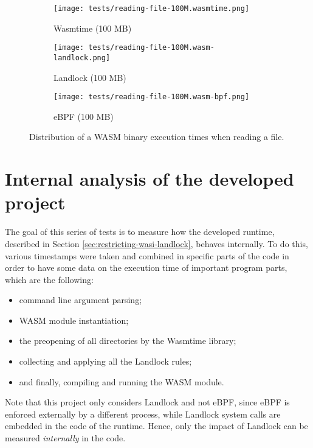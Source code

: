 \begin{figure}[ht!]
  \begin{subfigure}[b]{0.32\textwidth}
    \centering
    \texttt{[image: tests/reading-file-100M.wasmtime.png]}
    \caption{Wasmtime (100 MB)}
  \end{subfigure}
  \begin{subfigure}[b]{0.32\textwidth}
    \centering
    \texttt{[image: tests/reading-file-100M.wasm-landlock.png]}
    \caption{Landlock (100 MB)}
  \end{subfigure}
  \begin{subfigure}[b]{0.32\textwidth}
    \centering
    \texttt{[image: tests/reading-file-100M.wasm-bpf.png]}
    \caption{eBPF (100 MB)}
  \end{subfigure}

  \caption{Distribution of a WASM binary execution times when reading a file.}
  \label{fig:distribution-reading-wasm}
\end{figure}

\clearpage

\section{Internal analysis of the developed project}
\label{sec:performance-internal-analysis}

The goal of this series of tests is to measure how the developed runtime,
described in Section \ref{sec:restricting-wasi-landlock}, behaves internally.
To do this, various timestamps were taken and combined in specific parts of the
code in order to have some data on the execution time of important program parts,
which are the following:
\begin{itemize}
  \item command line argument parsing;
  \item WASM module instantiation;
  \item the preopening of all directories by the Wasmtime library;
  \item collecting and applying all the Landlock rules;
  \item and finally, compiling and running the WASM module.
\end{itemize}

Note that this project only considers Landlock and not eBPF, since eBPF is enforced externally
by a different process, while Landlock system calls are embedded in the code of the runtime.
Hence, only the impact of Landlock can be measured \textit{internally} in the code.

